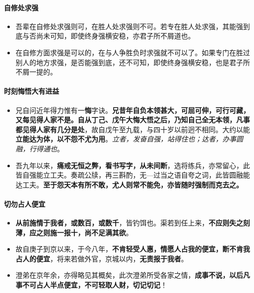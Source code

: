 \documentclass[UTF8,a4paper,8pt]{ctexbook}
\begin{document}
		\paragraph{自修处求强}
			\begin{itemize}
				\item  	吾辈在自修处求强则可，在胜人处求强则不可。若专在胜人处求强，其能强到底与否尚未可知，即使终身强横安稳，亦君子所不屑道也。
				\item   在自修方面求强是可以的，在与人争胜负时求强就不可以了。如果专门在胜过别人的地方求强，是否能强到底，还不可知，即使终身强横安稳，也是君子所不屑一提的。
			\end{itemize}
			
		\paragraph{时刻悔悟大有进益}
			\begin{itemize}
				\item  兄自问近年得力惟有一\textbf{悔}字诀。\textbf{兄昔年自负本领甚大，可屈可伸，可行可藏，又每见得人家不是。自从丁己、戊午大悔大悟之后，乃知自己全无本领，凡事都见得人家有几分是处}，故自戊午至九载，与四十岁以前迥不相同。大约以能\textbf{立能达为体，以不怨不尤为用}。\textit{立者，发奋自强，站得住也；达者，办事圆融，行得通也}。
				\item 吾九年以来，\textbf{痛戒无恒之弊，看书写字，从未间断}，选将练兵，亦常留心，此皆自强能立工夫。奏疏公牍，再三斟酌，无—过当之语自夸之词，此皆圆融能达工夫。\textbf{至于怨天本有所不敢，尤人则常不能免，亦皆随时强制而克去之。}
			\end{itemize}
			
		\paragraph{切勿占人便宜}
			\begin{itemize}
				\item \textbf{从前施情于我者，或数百，或数千}，皆钓饵也。渠若到任上来，\textbf{不应则失之刻薄，应之则施一报十，尚不足满其欲}。
				
				\item 故自庚子到京以来，于今八年，\textbf{不肯轻受人惠，情愿人占我的便宜，断不肯我占人的便宜}，将来若做外官，京城以内，\textbf{无责报于我者}。
				
				\item 澄弟在京年余，亦得略见其概矣，此次澄弟所受各家之情，\textbf{成事不说，以后凡事不可占人半点便宜，不可轻取人财，切记切记}！
			\end{itemize}
\end{document}
